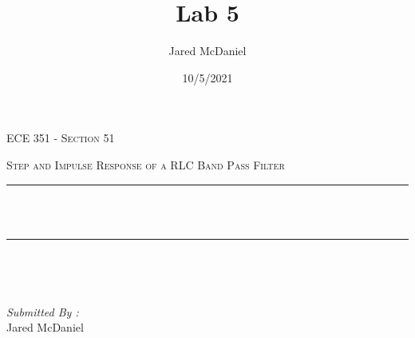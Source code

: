 \documentclass[12pt]{report}
\title{Lab 5}
\author{ Jared McDaniel}
\date{10/5/2021}
\makeatletter
\let\thetitle\@title
\makeatother
\begin{document}

\begin{titlepage}
	\centering
    \vspace*{0.5 cm}
\begin{center}    \textsc{\Large   ECE 351 - Section 51 }\\[2.0 cm]	\end{center}%
	\textsc{\Large Step and Impulse Response of a RLC Band Pass Filter  }\\[0.5 cm]				%
	\rule{\linewidth}{0.2 mm} \\[0.4 cm]
	{ \huge \bfseries \thetitle}\\
	\rule{\linewidth}{0.2 mm} \\[1.5 cm]
	
	\begin{minipage}{0.4\textwidth}
		\begin{flushleft} \large
			\end{flushleft}
			\end{minipage}~
			\begin{minipage}{0.4\textwidth}
            
			\begin{flushright} \large
			\emph{Submitted By :} \\
			Jared McDaniel  
		\end{flushright}
           
	\end{minipage}\\[2 cm]
	
    
    
    
    
	
\end{titlepage}


\tableofcontents
\pagebreak

\renewcommand{\thesection}{\arabic{section}}
\end{document}
